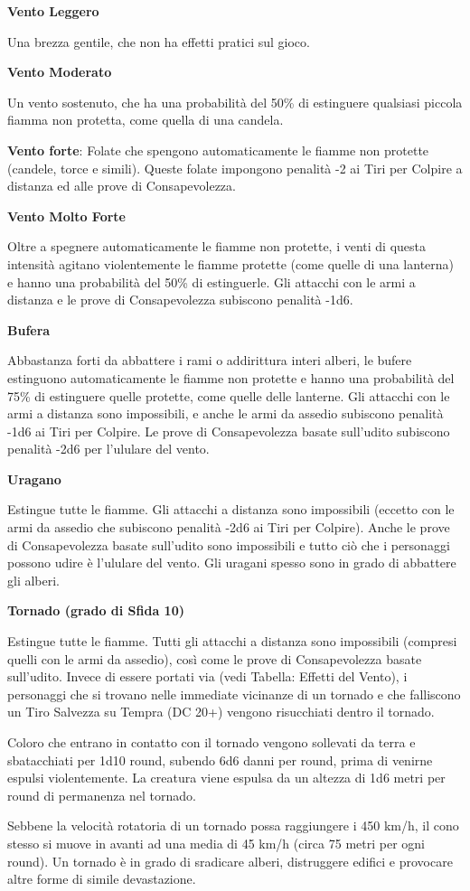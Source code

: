 \begin{multicols}{2}
\bigskip

\textbf{Vento Leggero}

Una brezza gentile, che non ha effetti pratici sul gioco.

\textbf{Vento Moderato}

Un vento sostenuto, che ha una probabilità del 50\% di estinguere qualsiasi piccola fiamma non protetta, come quella di una candela.

\textbf{Vento forte}: Folate che spengono automaticamente le fiamme non protette (candele, torce e simili). Queste folate impongono penalità -2 ai Tiri per Colpire a distanza ed alle prove di Consapevolezza.

\textbf{Vento Molto Forte}

Oltre a spegnere automaticamente le fiamme non protette, i venti di questa intensità agitano violentemente le fiamme protette (come quelle di una lanterna) e hanno una probabilità del 50\% di estinguerle. Gli attacchi con le armi a distanza e le prove di Consapevolezza subiscono penalità -1d6.

\textbf{Bufera}

Abbastanza forti da abbattere i rami o addirittura interi alberi, le bufere estinguono automaticamente le fiamme non protette e hanno una probabilità del 75\% di estinguere quelle protette, come quelle delle lanterne. Gli attacchi con le armi a distanza sono impossibili, e anche le armi da assedio subiscono penalità -1d6 ai Tiri per Colpire. Le prove di Consapevolezza basate sull'udito subiscono penalità -2d6 per l'ululare del vento.

\textbf{Uragano}

Estingue tutte le fiamme. Gli attacchi a distanza sono impossibili (eccetto con le armi da assedio che subiscono penalità -2d6 ai Tiri per Colpire). Anche le prove di Consapevolezza basate sull'udito sono impossibili e tutto ciò che i personaggi possono udire è l'ululare del vento. Gli uragani spesso sono in grado di abbattere gli alberi.

\textbf{Tornado (grado di Sfida 10)}

Estingue tutte le fiamme. Tutti gli attacchi a distanza sono impossibili (compresi quelli con le armi da assedio), così come le prove di Consapevolezza basate sull'udito. Invece di essere portati via (vedi Tabella: Effetti del Vento), i personaggi che si trovano nelle immediate vicinanze di un tornado e che falliscono un Tiro Salvezza su Tempra (DC 20+) vengono risucchiati dentro il tornado.

Coloro che entrano in contatto con il tornado vengono sollevati da terra e sbatacchiati per 1d10 round, subendo 6d6 danni per round, prima di venirne espulsi violentemente. La creatura viene espulsa da un altezza di 1d6 metri per round di permanenza nel tornado.

Sebbene la velocità rotatoria di un tornado possa raggiungere i 450 km/h, il cono stesso si muove in avanti ad una media di 45 km/h (circa 75 metri per ogni round). Un tornado è in grado di sradicare alberi, distruggere edifici e provocare altre forme di simile devastazione.

\end{multicols}


